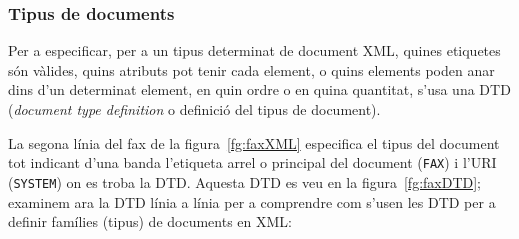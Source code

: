 \subsubsection{Tipus de documents}


Per a especificar, per a un tipus determinat de document XML, quines
etiquetes són vàlides, quins atributs pot tenir cada element, o quins
elements poden anar dins d'un determinat element, en quin ordre o en
quina quantitat, s'usa una DTD (\emph{document type definition} o
definició del tipus de document).

La segona línia del fax de la figura~\ref{fg:faxXML} especifica el
tipus del document tot indicant d'una banda l'etiqueta arrel o
principal del document (\texttt{FAX}) i l'URI (\texttt{SYSTEM}) on es
troba la DTD. Aquesta DTD es veu en la figura~\ref{fg:faxDTD};
examinem ara la DTD línia a línia per a comprendre com s'usen les DTD per
a definir famílies (tipus) de documents en XML:
